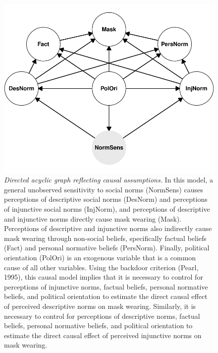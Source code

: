 \documentclass[
  man, donotrepeattitle,mask,floatsintext]{apa6}
\begin{document}
\begin{figure}
\centering
\includegraphics{manuscript_files/figure-latex/plotDAG-1.pdf}
\caption{\label{fig:plotDAG}\emph{Directed acyclic graph reflecting causal assumptions.} In this model, a general unobserved sensitivity to social norms (NormSens) causes perceptions of descriptive social norms (DesNorm) and perceptions of injunctive social norms (InjNorm), and perceptions of descriptive and injunctive norms directly cause mask wearing (Mask). Perceptions of descriptive and injunctive norms also indirectly cause mask wearing through non-social beliefs, specifically factual beliefs (Fact) and personal normative beliefs (PersNorm). Finally, political orientation (PolOri) is an exogenous variable that is a common cause of all other variables. Using the backdoor criterion (Pearl, 1995), this causal model implies that it is necessary to control for perceptions of injunctive norms, factual beliefs, personal normative beliefs, and political orientation to estimate the direct causal effect of perceived descriptive norms on mask wearing. Similarly, it is necessary to control for perceptions of descriptive norms, factual beliefs, personal normative beliefs, and political orientation to estimate the direct causal effect of perceived injunctive norms on mask wearing.}
\end{figure}

\newpage
\end{document}

